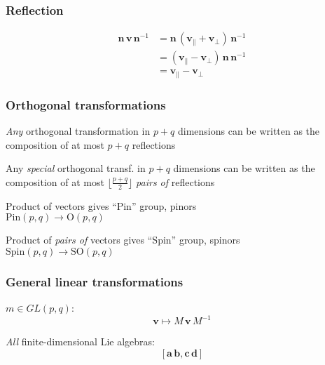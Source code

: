 \documentclass[12pt,xcolor={dvipsnames}]{beamer}
\renewcommand{\vec}{\bm}
\begin{document}

\begin{frame}
  \frametitle{Reflection}
  \begin{align*}
    \vec{n}\, \vec{v}\, \vec{n}^{-1} %
    &= \vec{n}\, (\vec{v}_{\parallel} + \vec{v}_{\perp})\,
    \vec{n}^{-1} \\ %
    &= (\vec{v}_{\parallel} - \vec{v}_{\perp})\, \vec{n}\,
    \vec{n}^{-1} \\ %
    &= \vec{v}_{\parallel} - \vec{v}_{\perp}
  \end{align*}

\end{frame}

\begin{frame}
  \frametitle{Orthogonal transformations}
  \emph{Any} orthogonal transformation in $p+q$ dimensions can be
  written as the composition of at most $p+q$ reflections \pause
  \vspace{0.2in}

  Any \emph{special} orthogonal transf. in $p+q$ dimensions can be
  written as the composition of at most $\lfloor \frac{p+q}{2}
  \rfloor$ \emph{pairs of} reflections \pause \vspace{0.2in}

  Product of vectors gives ``Pin'' group, pinors\\
  $\text{Pin}(p,q) \rightarrow \text{O}(p,q)$\vspace{0.2in}

  Product of \emph{pairs of} vectors gives ``Spin'' group, spinors\\
  $\text{Spin}(p,q) \rightarrow \text{SO}(p,q)$
\end{frame}

\begin{frame}
  \frametitle{General linear transformations}
  $m \in GL(p,q)$:
  \begin{equation*}
    \vec{v} \mapsto M\, \vec{v}\, M^{-1}
  \end{equation*}

  \pause \vspace{0.2in}

  \emph{All} finite-dimensional Lie algebras:
  \begin{equation*}
    \left[\vec{a}\, \vec{b}, \vec{c}\, \vec{d} \right]
  \end{equation*}
\end{frame}
\end{document}
